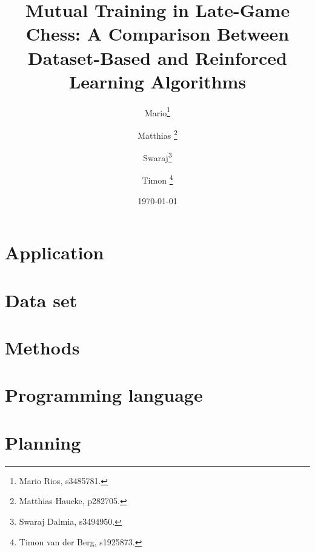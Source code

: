 \documentclass[10pt]{article}
\title{Mutual Training in Late-Game Chess: A Comparison Between Dataset-Based
and Reinforced Learning Algorithms}
\author{Mario\footnote{Mario Rios, s3485781.} \and Matthias \footnote{Matthias Haucke,
p282705.}
\and Swaraj\footnote{Swaraj Dalmia, s3494950.} \and Timon \footnote{Timon van
der Berg, s1925873.}}
\date{\today}
\begin{document}
\maketitle

\section{Application}
    
\section{Data set}
    
\section{Methods}
    
\section{Programming language}
    
\section{Planning}
    
\end{document}
